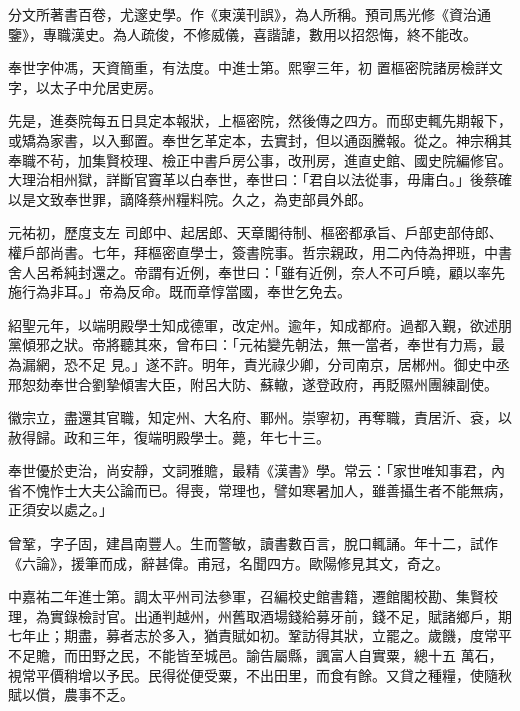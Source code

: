 \begin{pinyinscope}
 分文所著書百卷，尤邃史學。作《東漢刊誤》，為人所稱。預司馬光修《資治通鑒》，專職漢史。為人疏俊，不修威儀，喜諧謔，數用以招怨悔，終不能改。



 奉世字仲馮，天資簡重，有法度。中進士第。熙寧三年，初
 置樞密院諸房檢詳文字，以太子中允居吏房。



 先是，進奏院每五日具定本報狀，上樞密院，然後傳之四方。而邸吏輒先期報下，或矯為家書，以入郵置。奉世乞革定本，去實封，但以通函騰報。從之。神宗稱其奉職不茍，加集賢校理、檢正中書戶房公事，改刑房，進直史館、國史院編修官。大理治相州獄，詳斷官竇革以白奉世，奉世曰：「君自以法從事，毋庸白。」後蔡確以是文致奉世罪，謫降蔡州糧料院。久之，為吏部員外郎。



 元祐初，歷度支左
 司郎中、起居郎、天章閣待制、樞密都承旨、戶部吏部侍郎、權戶部尚書。七年，拜樞密直學士，簽書院事。哲宗親政，用二內侍為押班，中書舍人呂希純封還之。帝謂有近例，奉世曰：「雖有近例，奈人不可戶曉，顧以率先施行為非耳。」帝為反命。既而章惇當國，奉世乞免去。



 紹聖元年，以端明殿學士知成德軍，改定州。逾年，知成都府。過都入覲，欲述朋黨傾邪之狀。帝將聽其來，曾布曰：「元祐變先朝法，無一當者，奉世有力焉，最為漏網，恐不足
 見。」遂不許。明年，責光祿少卿，分司南京，居郴州。御史中丞邢恕劾奉世合劉摯傾害大臣，附呂大防、蘇轍，遂登政府，再貶隰州團練副使。



 徽宗立，盡還其官職，知定州、大名府、鄆州。崇寧初，再奪職，責居沂、袞，以赦得歸。政和三年，復端明殿學士。薨，年七十三。



 奉世優於吏治，尚安靜，文詞雅贍，最精《漢書》學。常云：「家世唯知事君，內省不愧怍士大夫公論而已。得喪，常理也，譬如寒暑加人，雖善攝生者不能無病，正須安以處之。」



 曾鞏，字子固，建昌南豐人。生而警敏，讀書數百言，脫口輒誦。年十二，試作《六論》，援筆而成，辭甚偉。甫冠，名聞四方。歐陽修見其文，奇之。



 中嘉祐二年進士第。調太平州司法參軍，召編校史館書籍，遷館閣校勘、集賢校理，為實錄檢討官。出通判越州，州舊取酒場錢給募牙前，錢不足，賦諸鄉戶，期七年止；期盡，募者志於多入，猶責賦如初。鞏訪得其狀，立罷之。歲饑，度常平不足贍，而田野之民，不能皆至城邑。諭告屬縣，諷富人自實粟，總十五
 萬石，視常平價稍增以予民。民得從便受粟，不出田里，而食有餘。又貸之種糧，使隨秋賦以償，農事不乏。




\end{pinyinscope}

